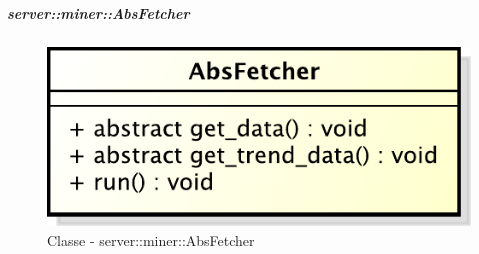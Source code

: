 		\subparagraph{server::miner::AbsFetcher} %
		\label{subp:server_miner_AbsFetcher}
		    \begin{figure}[!htbp]
 		 		\centering
 				\centerline{\includegraphics[scale=0.75]{./images/server/classes/miner/abs_fetcher.pdf}}
 				\caption{Classe - server::miner::AbsFetcher}
			\end{figure}
